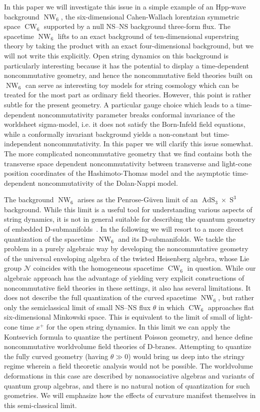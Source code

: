 \documentclass[11pt,a4paper]{article}
\DeclareMathOperator{\AdS}{AdS}
\DeclareMathOperator{\Sphere}{S}
\DeclareMathOperator{\NW}{NW}
\DeclareMathOperator{\CW}{CW}
\let\S\Sphere
\newcommand{\1}{\mathbb{1}}
\begin{document}
In this paper we will investigate this issue in a simple example of an
Hpp-wave background $\NW_6$, the six-dimensional Cahen-Wallach
lorentzian symmetric space $\CW_6$ supported by a null NS--NS
background three-form flux. The spacetime $\NW_6$ lifts to an exact
background of ten-dimensional superstring theory by taking the product
with an exact four-dimensional background, but we will not write this
explicitly. Open string dynamics on this background is particularly
interesting because it has the potential to display a time-dependent
noncommutative geometry, and hence the noncommutative field theories
built on $\NW_6$ can serve as interesting toy models for string
cosmology which can be treated for the most part as ordinary field
theories. However, this point is rather subtle for the present
geometry. A particular gauge choice which leads to a time-dependent
noncommutativity parameter breaks conformal invariance of the
worldsheet sigma-model, i.e. it does not satisfy the Born-Infeld field
equations, while a conformally invariant background yields a
non-constant but time-independent noncommutativity. In this paper we
will clarify this issue somewhat. The more complicated noncommutative
geometry that we find contains both the transverse space dependent
noncommutativity between transverse and light-cone position
coordinates of the Hashimoto-Thomas model and the asymptotic
time-dependent noncommutativity of the Dolan-Nappi model.

The background $\NW_6$ arises as the Penrose-G\"uven limit of an
$\AdS_3\times\S^3$ background. While this limit is a useful tool for
understanding various aspects of string dynamics, it is not in general
suitable for describing the quantum geometry of embedded
D-submanifolds~\cite{HSz1}. In the following we will resort to a more
direct quantization of the spacetime $\NW_6$ and its
D-submanifolds. We tackle the problem in a purely algebraic way by
developing the noncommutative geometry of the
universal enveloping algebra of the twisted Heisenberg algebra, whose
Lie group $\mathcal{N}$ coincides with the homogeneous spacetime $\CW_6$ in
question. While our algebraic approach has the advantage of yielding
very explicit constructions of noncommutative field theories in
these settings, it also has several limitations. It does not describe
the full quantization of the curved spacetime $\NW_6$, but rather only
the semiclassical limit of small NS--NS flux $\theta$ in which $\CW_6$
approaches flat six-dimensional Minkowski space. This is equivalent to
the limit of small of light-cone time $x^+$ for the open string
dynamics. In this limit we can apply the Kontsevich formula to
quantize the pertinent Poisson geometry, and hence define
noncommutative worldvolume field theories of D-branes. Attempting to
quantize the fully curved geometry (having $\theta\gg0$) would bring
us deep into the stringy regime wherein a field theoretic analysis would not be
possible. The worldvolume deformations in this case are described by
nonassociative algebras and variants of quantum group algebras, and
there is no natural notion of quantization for such geometries. We
will emphasize how the effects of curvature manifest themselves in
this semi-classical limit.
\end{document}
